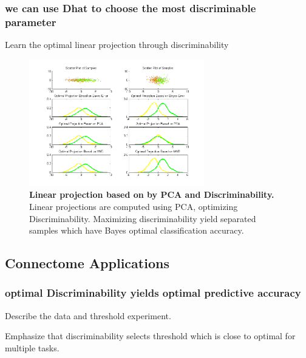 \documentclass{article}
\begin{document}
\subsubsection{we can use Dhat to choose the most discriminable parameter }
 Learn the optimal linear projection through discriminability

\begin{figure}[ht!]
	\includegraphics[width=3.0in]{../Figs/parameter_selection_2sub.png}
	\caption{{\bf Linear projection based on by PCA and Discriminability.} Linear projections are computed using PCA, optimizing Discriminability. Maximizing discriminability yield separated samples which have Bayes optimal classification accuracy. }
	\label{fig:3}
\end{figure}


\subsection{Connectome Applications}

\subsubsection{optimal Discriminability yields optimal predictive accuracy}
 Describe the data and threshold experiment. 

 Emphasize that discriminability selects threshold which is close to optimal for multiple tasks.
\end{document}
